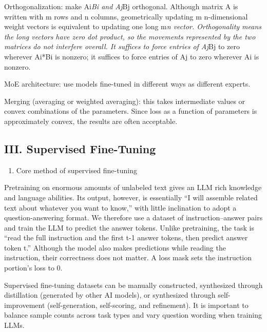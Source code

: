 Orthogonalization: make Ai\emph{Bi and Aj}Bj orthogonal. Although matrix A is written with m rows and n columns, geometrically updating m n-dimensional weight vectors is equivalent to updating one long m\emph{n vector. Orthogonality means the long vectors have zero dot product, so the movements represented by the two matrices do not interfere overall. It suffices to force entries of Aj}Bj to zero wherever Ai*Bi is nonzero; it suffices to force entries of Aj to zero wherever Ai is nonzero.

MoE architecture: use models fine-tuned in different ways as different experts.

Merging (averaging or weighted averaging): this takes intermediate values or convex combinations of the parameters. Since loss as a function of parameters is approximately convex, the results are often acceptable.

\hypertarget{iii.-supervised-fine-tuning}{%
\subsection{III. Supervised Fine-Tuning}\label{iii.-supervised-fine-tuning}}

\begin{enumerate}
\def\labelenumi{\arabic{enumi}.}
\tightlist
\item
  Core method of supervised fine-tuning
\end{enumerate}

Pretraining on enormous amounts of unlabeled text gives an LLM rich knowledge and language abilities. Its output, however, is essentially ``I will assemble related text about whatever you want to know,'' with little inclination to adopt a question-answering format. We therefore use a dataset of instruction--answer pairs and train the LLM to predict the answer tokens. Unlike pretraining, the task is ``read the full instruction and the first t-1 answer tokens, then predict answer token t.'' Although the model also makes predictions while reading the instruction, their correctness does not matter. A loss mask sets the instruction portion's loss to 0.

Supervised fine-tuning datasets can be manually constructed, synthesized through distillation (generated by other AI models), or synthesized through self-improvement (self-generation, self-scoring, and refinement). It is important to balance sample counts across task types and vary question wording when training LLMs.

